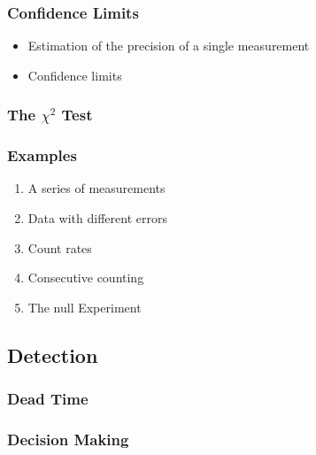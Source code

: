 \subsubsection{Confidence Limits}
\begin{itemize}
    \item Estimation of the precision of a single measurement
    \item Confidence limits
\end{itemize}
\subsubsection{The \texorpdfstring{$\chi^2$}{Chi-squared} Test}
\subsubsection{Examples}
\begin{enumerate}
    \item A series of measurements
    \item Data with different errors
    \item Count rates
    \item Consecutive counting
    \item The null Experiment
\end{enumerate}
\subsection{Detection}
\subsubsection{Dead Time}
\subsubsection{Decision Making}
